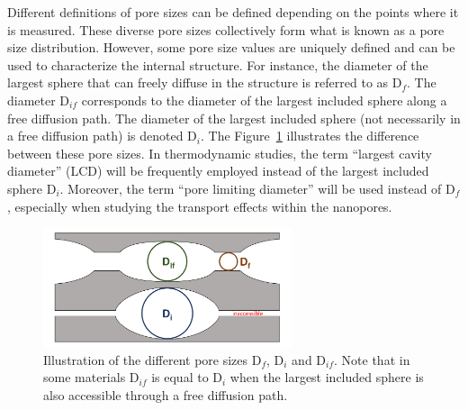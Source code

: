\documentclass[main.tex]{subfiles}
\begin{document}
Different definitions of pore sizes can be defined depending on the points where it is measured. These diverse pore sizes collectively form what is known as a pore size distribution. However, some pore size values are uniquely defined and can be used to characterize the internal structure. For instance, the diameter of the largest sphere that can freely diffuse in the structure is referred to as D$_f$. The diameter D$_{if}$ corresponds to the diameter of the largest included sphere along a free diffusion path. The diameter of the largest included sphere (not necessarily in a free diffusion path) is denoted D$_i$. The Figure~\ref{fgr:pore_size} illustrates the difference between these pore sizes. In thermodynamic studies, the term ``largest cavity diameter'' (LCD) will be frequently employed instead of the largest included sphere D$_i$. Moreover, the term ``pore limiting diameter'' will be used instead of D$_f$, especially when studying the transport effects within the nanopores.

\begin{figure}[ht]
  \centering
  \includegraphics[width=0.65\textwidth]{figures/2-thermo/pores.pdf}
  \caption{Illustration of the different pore sizes D$_f$, D$_i$ and D$_{if}$. Note that in some materials D$_{if}$ is equal to D$_i$ when the largest included sphere is also accessible through a free diffusion path. }\label{fgr:pore_size}
\end{figure}
\end{document}
